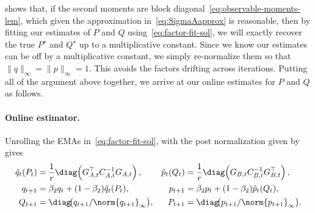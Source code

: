  shows that, if the second moments are block diagonal~\eqref{eq:observable-moments-lem}, which given the approximation in~\eqref{eq:SigmaAapprox} is reasonable, then by fitting our estimates of $P$ and $Q$ using~\eqref{eq:factor-fit-sol}, we will exactly recover the true $P^\star$ and $Q^\star$ up to a multiplicative constant. Since we know our estimates can be off by a multiplicative constant, we simply re-normalize them so that $\|q\|_{\infty} = \|p\|_{\infty} =1.$ This avoids the factors drifting across iterations. Putting all of the argument above together, we arrive at our online estimates for $P$ and $Q$ as follows.


\paragraph{Online estimator.}

Unrolling the EMAs in~\eqref{eq:factor-fit-sol}, with the post normalization given by  gives
\begin{equation}\label{eq:ours-klcoupling}
\begin{aligned}
  \hat{q}_t(P_t) &= \frac1r\diag\!\left(G_{A,t}^\top C_{A,t}^{-1}G_{A,t}\right),
  &
  \hat{p}_t(Q_t) &= \frac1r\diag\!\left(G_{B,t} C_{B,t}^{-1}G_{B,t}^\top\right),
  \\
  q_{t+1} &= \beta_2q_t+(1-\beta_2)\hat{q}_t(P_t),
  &
  p_{t+1} &= \beta_2p_t+(1-\beta_2)\hat{p}_t(Q_t),
  \\
  Q_{t+1} &= \diag\!\bigl(q_{t+1}/\norm{q_{t+1}}_\infty\bigr),
  &
  P_{t+1} &= \diag\!\bigl(p_{t+1}/\norm{p_{t+1}}_\infty\bigr).
\end{aligned}
\end{equation}




